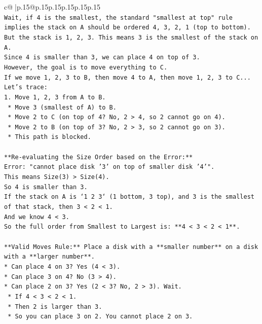 \documentclass{article}
\begin{document}
{\begin{supertabular}{c@{$\;$}|p{.15\linewidth}@{}p{.15\linewidth}p{.15\linewidth}p{.15\linewidth}p{.15\linewidth}p{.15\linewidth}}
{{{\\ 
\texttt{Wait, if 4 is the smallest, the standard "smallest at top" rule implies the stack on A should be ordered 4, 3, 2, 1 (top to bottom). But the stack is 1, 2, 3. This means 3 is the smallest of the stack on A.} \\
\texttt{Since 4 is smaller than 3, we can place 4 on top of 3.} \\
\texttt{However, the goal is to move everything to C.} \\
\texttt{If we move 1, 2, 3 to B, then move 4 to A, then move 1, 2, 3 to C...} \\
\texttt{Let's trace:} \\
\texttt{1.  Move 1, 2, 3 from A to B.} \\
\texttt{    *   Move 3 (smallest of A) to B.} \\
\texttt{    *   Move 2 to C (on top of 4? No, 2 > 4, so 2 cannot go on 4).} \\
\texttt{    *   Move 2 to B (on top of 3? No, 2 > 3, so 2 cannot go on 3).} \\
\texttt{    *   This path is blocked.} \\
\\ 
\texttt{**Re{-}evaluating the Size Order based on the Error:**} \\
\texttt{Error: "cannot place disk '3' on top of smaller disk '4'".} \\
\texttt{This means Size(3) > Size(4).} \\
\texttt{So 4 is smaller than 3.} \\
\texttt{If the stack on A is `1 2 3` (1 bottom, 3 top), and 3 is the smallest of that stack, then 3 < 2 < 1.} \\
\texttt{And we know 4 < 3.} \\
\texttt{So the full order from Smallest to Largest is: **4 < 3 < 2 < 1**.} \\
\\ 
\texttt{**Valid Moves Rule:** Place a disk with a **smaller number** on a disk with a **larger number**.} \\
\texttt{*   Can place 4 on 3? Yes (4 < 3).} \\
\texttt{*   Can place 3 on 4? No (3 > 4).} \\
\texttt{*   Can place 2 on 3? Yes (2 < 3? No, 2 > 3). Wait.} \\
\texttt{    *   If 4 < 3 < 2 < 1.} \\
\texttt{    *   Then 2 is larger than 3.} \\
\texttt{    *   So you can place 3 on 2. You cannot place 2 on 3.} \\
}}}
\end{supertabular}}
\end{document}
